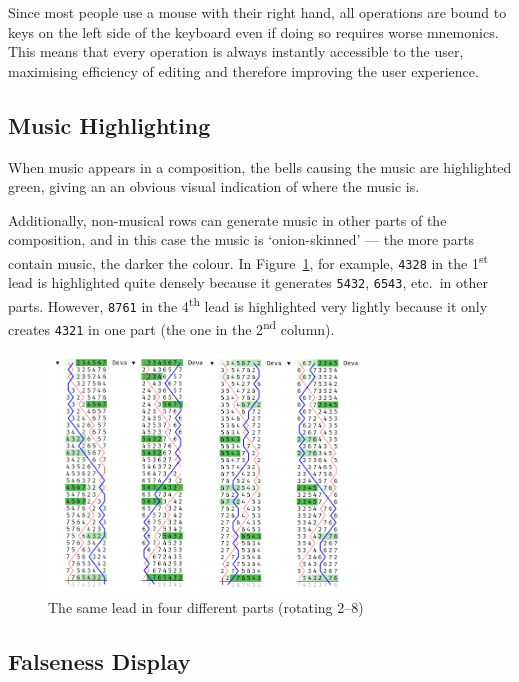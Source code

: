 \documentclass[12pt]{article}
\newcommand{\row}[1]{\texttt{#1}}
\newcommand{\nth}[2]{#1\textsuperscript{#2}}
\begin{document}
Since most people use a mouse with their right hand, all operations are bound to keys on the left
side of the keyboard even if doing so requires worse mnemonics.  This means that every operation is
always instantly accessible to the user, maximising efficiency of editing and therefore improving
the user experience.

\subsection{Music Highlighting}

When music appears in a composition, the bells causing the music are highlighted green, giving an
an obvious visual indication of where the music is.

Additionally, non-musical rows can generate music in other parts of the composition, and in this
case the music is `onion-skinned' --- the more parts contain music, the darker the colour.  In
Figure~\ref{fig:multi-part-music}, for example, \row{4328} in the \nth{1}{st} lead is highlighted quite
densely because it generates \row{5432}, \row{6543}, etc.\ in other parts.  However, \row{8761} in
the \nth{4}{th} lead is highlighted very lightly because it only creates \row{4321} in one part
(the one in the \nth{2}{nd} column).

\begin{figure}
    \centering
    \includegraphics[width=0.75\textwidth]{multi-part-music-clean}
    \caption{The same lead in four different parts (rotating 2--8)}\label{fig:multi-part-music}
\end{figure}

\subsection{Falseness Display}
\end{document}
